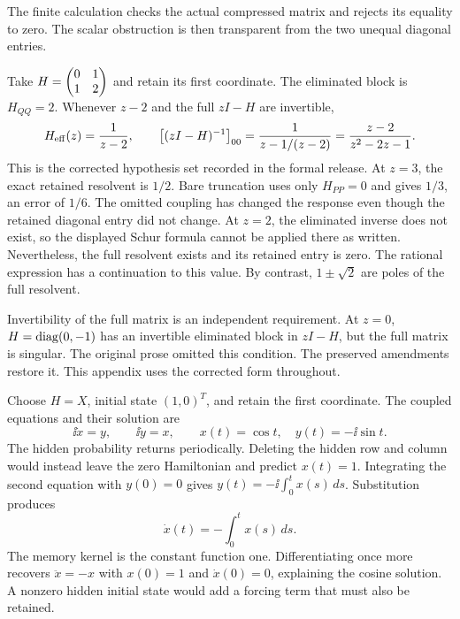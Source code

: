 The finite calculation checks the actual compressed matrix and rejects its equality to zero. The scalar obstruction is then transparent from the two unequal diagonal entries.

Take $H=\begin{pmatrix}0&1\\1&2\end{pmatrix}$ and retain its first coordinate. The eliminated block is $H_{QQ}=2$. Whenever $z-2$ and the full $zI-H$ are invertible,
\[
H_{\rm eff}(z)=\frac1{z-2},\qquad
\bigl[(zI-H)^{-1}\bigr]_{00}
=\frac1{z-1/(z-2)}=\frac{z-2}{z^2-2z-1}.
\]
This is the corrected hypothesis set recorded in the formal release.
At $z=3$, the exact retained resolvent is $1/2$. Bare truncation uses only $H_{PP}=0$ and gives $1/3$, an error of $1/6$. The omitted coupling has changed the response even though the retained diagonal entry did not change.
At $z=2$, the eliminated inverse does not exist, so the displayed Schur formula cannot be applied there as written. Nevertheless, the full resolvent exists and its retained entry is zero. The rational expression has a continuation to this value. By contrast, $1\pm\sqrt2$ are poles of the full resolvent.

Invertibility of the full matrix is an independent requirement. At $z=0$, $H=\operatorname{diag}(0,-1)$ has an invertible eliminated block in $zI-H$, but the full matrix is singular. The original prose omitted this condition. The preserved amendments restore it. This appendix uses the corrected form throughout.

Choose $H=X$, initial state $(1,0)^T$, and retain the first coordinate. The coupled equations and their solution are
\[
\ii\dot x=y,\qquad \ii\dot y=x,\qquad
x(t)=\cos t,\quad y(t)=-\ii\sin t.
\]
The hidden probability returns periodically. Deleting the hidden row and column would instead leave the zero Hamiltonian and predict $x(t)=1$.
Integrating the second equation with $y(0)=0$ gives $y(t)=-\ii\int_0^tx(s)\,ds$. Substitution produces
\[
\dot x(t)=-\int_0^tx(s)\,ds.
\]
The memory kernel is the constant function one. Differentiating once more recovers $\ddot x=-x$ with $x(0)=1$ and $\dot x(0)=0$, explaining the cosine solution. A nonzero hidden initial state would add a forcing term that must also be retained.

